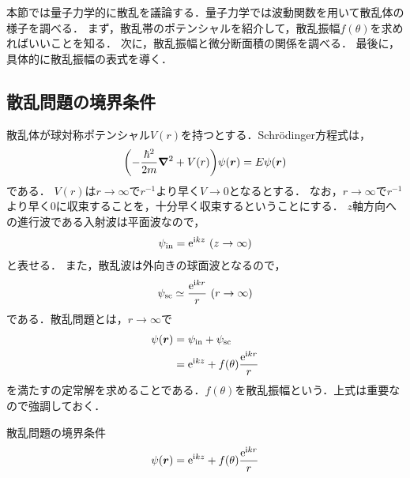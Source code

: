 \documentclass{report}
\begin{document}
  本節では量子力学的に散乱を議論する．量子力学では波動関数を用いて散乱体の様子を調べる．
  まず，散乱帯のポテンシャルを紹介して，散乱振幅$f(\theta)$を求めればいいことを知る．
  次に，散乱振幅と微分断面積の関係を調べる．
  最後に，具体的に散乱振幅の表式を導く．
  \subsection{散乱問題の境界条件}
    散乱体が球対称ポテンシャル$V(r)$を持つとする．Schrödinger方程式は，
    \begin{align}
      \qty(-\frac{\hbar^2}{2m}\grad^2 + V(r))\psi(\bm{r}) = E \psi(\bm{r})\label{se-scattering}
    \end{align}
    である．
    $V(r)$は$r \to \infty$で$r^{-1}$より早く$V \to 0$となるとする．
    なお，$r \to \infty$で$r^{-1}$より早く$0$に収束することを，十分早く収束するということにする．
    $z$軸方向への進行波である入射波は平面波なので，
    \begin{align}
      \psi_{\mathrm{in}} = \mathrm{e}^{\mathrm{i} k z}\ (z \to \infty)
    \end{align}
    と表せる．
    また，散乱波は外向きの球面波となるので，
    \begin{align}
      \psi_{\mathrm{sc}} \simeq \frac{\mathrm{e}^{\mathrm{i} kr}}{r}\ (r \to \infty)
    \end{align}
    である．散乱問題とは，$r \to \infty$で
    \begin{align}
      \psi(\bm{r}) &= \psi_{\mathrm{in}} + \psi_{\mathrm{sc}} \\ 
      &= \mathrm{e}^{\mathrm{i} kz} + f(\theta) \frac{\mathrm{e}^{\mathrm{i} kr}}{r}
    \end{align}
    を満たすの定常解を求めることである．$f(\theta)$を散乱振幅という．上式は重要なので強調しておく．
    \begin{itembox}[l]{散乱問題の境界条件}
      \begin{align}
        \psi(\bm{r}) = \mathrm{e}^{\mathrm{i} kz} + f(\theta) \frac{\mathrm{e}^{\mathrm{i} kr}}{r}\label{psi-r-in-sc-k}
      \end{align}
    \end{itembox}
\end{document}
